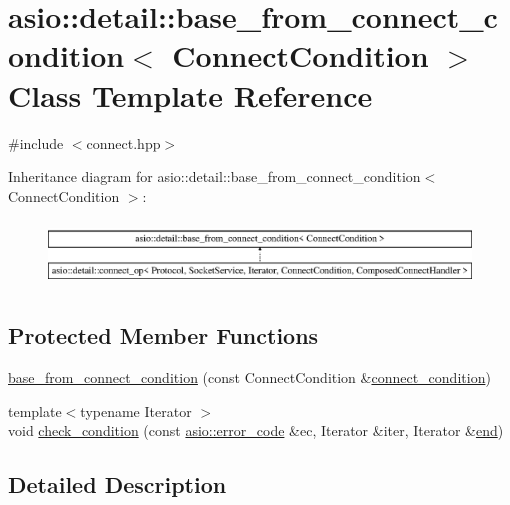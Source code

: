 \hypertarget{classasio_1_1detail_1_1base__from__connect__condition}{}\section{asio\+:\+:detail\+:\+:base\+\_\+from\+\_\+connect\+\_\+condition$<$ Connect\+Condition $>$ Class Template Reference}
\label{classasio_1_1detail_1_1base__from__connect__condition}


{\ttfamily \#include $<$connect.\+hpp$>$}

Inheritance diagram for asio\+:\+:detail\+:\+:base\+\_\+from\+\_\+connect\+\_\+condition$<$ Connect\+Condition $>$\+:\begin{figure}[H]
\begin{center}
\leavevmode
\includegraphics[height=1.774960cm]{classasio_1_1detail_1_1base__from__connect__condition}
\end{center}
\end{figure}
\subsection*{Protected Member Functions}
\begin{DoxyCompactItemize}
\item 
\hyperlink{classasio_1_1detail_1_1base__from__connect__condition_a65abd051354634bc7b49fd49ad0f49bf}{base\+\_\+from\+\_\+connect\+\_\+condition} (const Connect\+Condition \&\hyperlink{group__async__connect_ga47e3dda205dfba3553f4c7e005897687}{connect\+\_\+condition})
\item 
{\footnotesize template$<$typename Iterator $>$ }\\void \hyperlink{classasio_1_1detail_1_1base__from__connect__condition_af96f672591fcba7426bd728286fba268}{check\+\_\+condition} (const \hyperlink{classasio_1_1error__code}{asio\+::error\+\_\+code} \&ec, Iterator \&iter, Iterator \&\hyperlink{group__async__connect_gadb6ad0193229ae84828688e812cd325c}{end})
\end{DoxyCompactItemize}


\subsection{Detailed Description}

